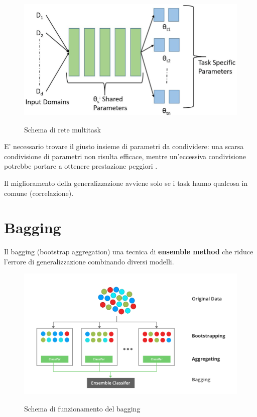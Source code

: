 \begin{figure}[ht]
  \centering
  \includegraphics[width=0.8\linewidth]{images/multitask.png}
  \label{img:multitask}
  \caption{Schema di rete multitask \cite{img:multitask}}
\end{figure}

E' necessario trovare il giusto insieme di parametri da condividere: una scarsa condivisione di parametri non risulta efficace, mentre un'eccessiva condivisione potrebbe portare a ottenere 
prestazione peggiori \cite{crawshaw2020multi}. 

Il miglioramento della generalizzazione avviene solo se i task hanno qualcosa in comune (correlazione).


\section{Bagging}
Il bagging (bootstrap aggregation) una tecnica di \textbf{ensemble method} che riduce 
l'errore di generalizzazione combinando diversi modelli.

\begin{figure}[ht]
  \centering
  \includegraphics[width=0.9\linewidth]{images/bagging.png}
  \label{img:bagging}
  \caption{Schema di funzionamento del bagging \cite{img:bagging}}
\end{figure}

